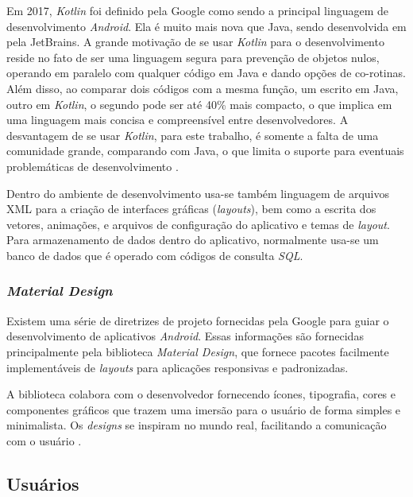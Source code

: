 Em 2017, \textit{Kotlin} foi definido pela Google como sendo a principal linguagem de desenvolvimento \textit{Android}. Ela é muito mais nova que Java, sendo desenvolvida em pela JetBrains. A grande motivação de se usar \textit{Kotlin} para o desenvolvimento reside no fato de ser uma linguagem segura para prevenção de objetos nulos, operando em paralelo com qualquer código em Java e dando opções de co-rotinas. Além disso, ao comparar dois códigos com a mesma função, um escrito em Java, outro em \textit{Kotlin}, o segundo pode ser até 40\% mais compacto, o que implica em uma linguagem mais concisa e compreensível entre desenvolvedores. A desvantagem de se usar \textit{Kotlin}, para este trabalho, é somente a falta de uma comunidade grande, comparando com Java, o que limita o suporte para eventuais problemáticas de desenvolvimento \cite{site:kotlinxjava}.

Dentro do ambiente de desenvolvimento usa-se também linguagem de arquivos XML para a criação de interfaces gráficas (\textit{layouts}), bem como a escrita dos vetores, animações, e arquivos de configuração do aplicativo e temas de \textit{layout}. Para armazenamento de dados dentro do aplicativo, normalmente usa-se um banco de dados que é operado com códigos de consulta \textit{SQL}.

\subsubsection{\textit{Material Design}}
Existem uma série de diretrizes de projeto fornecidas pela Google para guiar o desenvolvimento de aplicativos \textit{Android}. Essas informações são fornecidas principalmente pela biblioteca \textit{Material Design}, que fornece pacotes facilmente implementáveis de \textit{layouts} para aplicações responsivas e padronizadas.

A biblioteca colabora com o desenvolvedor fornecendo ícones, tipografia, cores e componentes gráficos que trazem uma imersão para o usuário de forma simples e minimalista. Os \textit{designs} se inspiram no mundo real, facilitando a comunicação com o usuário \cite{site:materialdesign}.

\subsection{Usuários}

